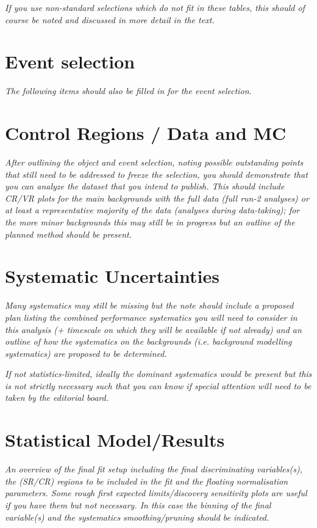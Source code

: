 \documentclass[NOTE, atlasdraft=true, texlive=2016, USenglish]{\ATLASLATEXPATH atlasdoc}
\begin{document}
\textit{If you use non-standard selections which do not fit in these tables, this should of course 
be noted and discussed in more detail in the text.}
 









\section{Event selection}
\textit{The following items should also be filled in for the event selection.}




\section{Control Regions / Data and MC}
\textit{After outlining the object and event selection, noting possible outstanding points that still
need to be addressed to freeze the selection, you should demonstrate that you can analyze
the dataset that you intend to publish.  This should include CR/VR plots for
the main backgrounds with the full data (full run-2 analyses) or at least a representative
majority of the data (analyses during data-taking); for the more minor backgrounds this may
still be in progress but an outline of the planned method should be present.}


\section{Systematic Uncertainties}

\textit{Many systematics may still be missing but the note should include a proposed plan
listing the combined performance systematics you will need to consider in this analysis 
(+ timescale on which they will be available if not already) and an outline of how the 
systematics on the backgrounds (i.e. background modelling systematics) are proposed to be determined.}

\textit{If not statistics-limited, ideally the dominant systematics would be present but this is not
strictly necessary such that you can know if special attention will need to be taken by the
editorial board.}



\section{Statistical Model/Results}

\textit{An overview of the final fit setup including the final discriminating variables(s),
the (SR/CR) regions to be included in the fit and the floating normalisation parameters.
Some rough first  expected limits/discovery sensitivity plots are useful if you have them but
not necessary. In this case the binning of the final variable(s) and the systematics
smoothing/pruning should be indicated.}
\end{document}
